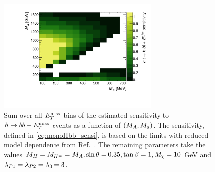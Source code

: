 \begin{figure}[tbp]
\centering
\includegraphics[width=0.7\textwidth]{texinputs/04_grid/figures/monoHbb_sensi_sum_bins_1_2_3_4_ma_vs_mA_lin.pdf}
\caption[Sensitivity to $h\to bb + \MET$ signals in $\mA$ - $\ma$ plane, summed across $\MET$ bins]
{
Sum over all $\MET$-bins of the estimated sensitivity to $h\to bb + \MET$ events as a function of $(M_{A},M_{a})$. 
The sensitivity, defined in \autoref{eq:monoHbb_sensi}, is based on the limits with reduced model dependence from Ref.~\cite{Aaboud:2017yqz}. 
The remaining parameters take the values $ M_{H}=M_{H^{\pm}}= M_{A}, \sin\theta = 0.35, \tan\beta = 1, M_{\chi} = 10$ GeV and $ \lambda_{P1} = \lambda_{P2} = \lambda_{3} = 3 $.}
\label{fig:monoHbb_sensi_full_mA_ma}
\end{figure}


